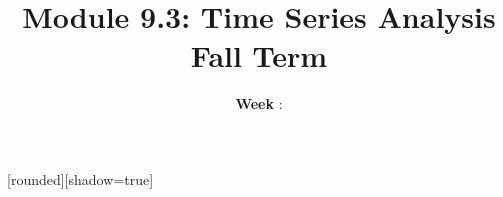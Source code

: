 

\usepackage{exscale,latexsym,microtype,amsmath,amssymb,amsfonts,graphicx,natbib,times,booktabs,xstring}

\newcommand{\E}{\ensuremath{{\mathbb E}}} %
\newcommand{\R}{\ensuremath{{\mathbb R}}}
\newcommand{\Var}{\ensuremath{{\mathbb V}}} %
\newcommand{\frameit}[2]{\begin{frame}\frametitle{#1}\begin{itemize}#2\end{itemize}\end{frame}}
\def\func#1{\mathop{\rm #1}}
\def\er#1{\emph{\color{red}#1}}
\def\newblock{\hskip .11em plus .33em minus .07em}
\def\limfunc#1{\mathop{\rm #1}}%
[rounded][shadow=true]
\date{}

\title{Module 9.3: Time Series Analysis\\Fall Term\space\number\year}
\def\theweek{}
\author[Week \theweek]{\textbf{Week \theweek}:}

